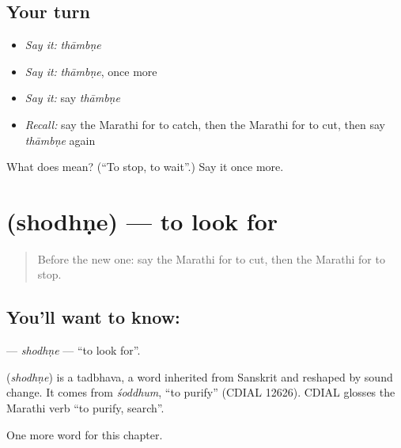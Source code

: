 \subsection*{Your turn}
\begin{itemize}
\raggedright
  \item \emph{Say it:} \emph{thāmbṇe}
  \item \emph{Say it:} \emph{thāmbṇe}, once more
  \item \emph{Say it:} say \emph{thāmbṇe}
  \item \emph{Recall:} say the Marathi for to catch, then the Marathi for to cut, then say \emph{thāmbṇe} again
\end{itemize}

\begin{tcolorbox}[breakable,colback=teal!4,colframe=teal!35!black,title={Before you move on}]
What does  mean? (\textquotedblleft{}To stop, to wait\textquotedblright{}.) Say it once more.
\end{tcolorbox}
\section[\texorpdfstring{\mr{शोधणे} (shodhṇe)}{शोधणे (shodhṇe)}]{ (shodhṇe) — to look for}

\label{lesson:MR-C81-shodhne}



\begin{quote}
Before the new one: say the Marathi for to cut, then the Marathi for to stop.
\end{quote}

\subsection*{You'll want to know: }
\textbf{} — \emph{shodhṇe} — \textquotedblleft{}to look for\textquotedblright{}.

\begin{cousinweb}
\textbf{} (\emph{shodhṇe}) is a tadbhava, a word inherited from Sanskrit and reshaped by sound change. It comes from \emph{śoddhum}, \textquotedblleft{}to purify\textquotedblright{} (CDIAL 12626). CDIAL glosses the Marathi verb \textquotedblleft{}to purify, search\textquotedblright{}.
\end{cousinweb}

\begin{grammarlens}[title={What you've built}]
One more word for this chapter.
\end{grammarlens}

